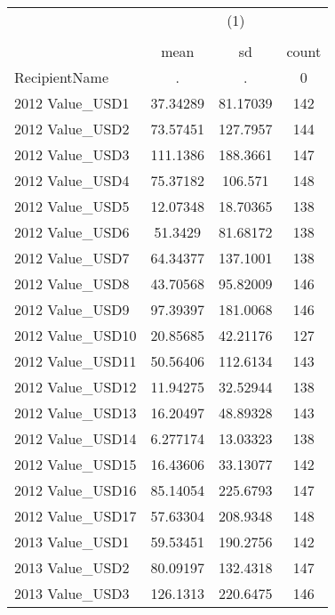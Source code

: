 {
\def\sym#1{\ifmmode^{#1}\else\(^{#1}\)\fi}
\begin{tabular}{l*{1}{ccc}}
\hline\hline
                    &\multicolumn{3}{c}{(1)}               \\
                    &\multicolumn{3}{c}{}                  \\
                    &        mean&          sd&       count\\
\hline
RecipientName       &           .&           .&           0\\
2012 Value\_USD1     &    37.34289&    81.17039&         142\\
2012 Value\_USD2     &    73.57451&    127.7957&         144\\
2012 Value\_USD3     &    111.1386&    188.3661&         147\\
2012 Value\_USD4     &    75.37182&     106.571&         148\\
2012 Value\_USD5     &    12.07348&    18.70365&         138\\
2012 Value\_USD6     &     51.3429&    81.68172&         138\\
2012 Value\_USD7     &    64.34377&    137.1001&         138\\
2012 Value\_USD8     &    43.70568&    95.82009&         146\\
2012 Value\_USD9     &    97.39397&    181.0068&         146\\
2012 Value\_USD10    &    20.85685&    42.21176&         127\\
2012 Value\_USD11    &    50.56406&    112.6134&         143\\
2012 Value\_USD12    &    11.94275&    32.52944&         138\\
2012 Value\_USD13    &    16.20497&    48.89328&         143\\
2012 Value\_USD14    &    6.277174&    13.03323&         138\\
2012 Value\_USD15    &    16.43606&    33.13077&         142\\
2012 Value\_USD16    &    85.14054&    225.6793&         147\\
2012 Value\_USD17    &    57.63304&    208.9348&         148\\
2013 Value\_USD1     &    59.53451&    190.2756&         142\\
2013 Value\_USD2     &    80.09197&    132.4318&         147\\
2013 Value\_USD3     &    126.1313&    220.6475&         146\\

\end{tabular}}
